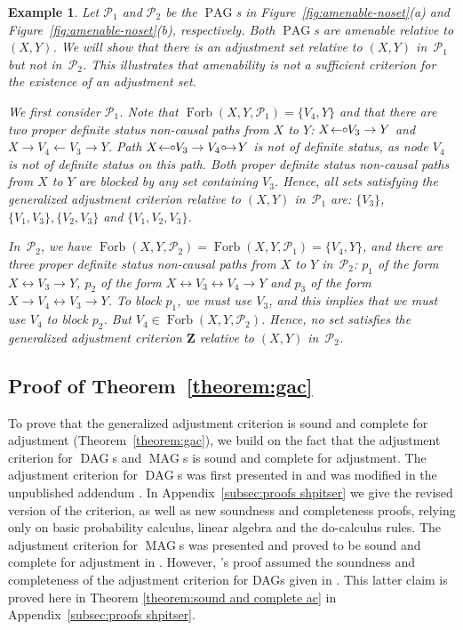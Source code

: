 \documentclass[11pt,a4paper]{article}
\newtheorem{example}{Example}
\DeclareMathOperator{\DAG}{DAG}
\DeclareMathOperator{\MAG}{MAG}
\DeclareMathOperator{\PAG}{PAG}
\DeclareMathOperator{\Forbi}{Forb}
\newcommand{\g}[1][G]{\mathcal{#1}}
\newcommand{\f}[2][X,Y]{\Forbi(#1,#2)}
\newcommand{\circarrow}{
  \setlength{\unitlength}{1mm}
  \begin{picture}(5,1)(0,0)
    \put(1,1){\circle{1}}
    \put(1.2,0){$\rightarrow$}
  \end{picture}
}
\newcommand{\arrowcirc}{
  \setlength{\unitlength}{1mm}
  \begin{picture}(5,1)(0,0)
    \put(0.2,0){$\leftarrow$}
    \put(4.3,1){\circle{1}}
  \end{picture}
}
\begin{document}
\begin{example}
  Let $\g[P]_1$ and $\g[P]_{2}$ be the $\PAG$s in Figure~\ref{fig:amenable-noset}(a) and Figure~\ref{fig:amenable-noset}(b), respectively.
  Both $\PAG$s are amenable relative to $(X,Y)$. We will show that there is an adjustment set relative to $(X,Y)$ in~$\g[P]_1$ but not in~$\g[P]_{2}$. This illustrates that amenability is not a sufficient
  criterion for the existence of an adjustment set.

  We first consider $\g[P]_1$. Note that $\f{\g[P]_1} = \{ V_4, Y \}$ and that there are two proper definite status non-causal paths from $X$ to $Y$: $X \arrowcirc V_3 \rightarrow Y$ and $X \rightarrow V_4 \leftarrow V_3 \rightarrow Y$. Path $X \arrowcirc V_3 \rightarrow V_4 \circarrow Y$ is not of definite status, as node $V_4$ is not of definite status on this path. Both proper definite status non-causal paths from $X$ to $Y$ are blocked by any set containing $V_3$. Hence, all sets satisfying the generalized adjustment criterion relative to $(X,Y)$ in~$\g[P]_1$ are: $\{ V_3 \}$, $\{V_1, V_3 \}, \{V_2, V_3 \}$ and $\{ V_1, V_2, V_3 \}$.

  In~$\g[P]_{2}$, we have $\f{\g[P]_{2}} = \f{\g[P]_1} = \{ V_4, Y \}$, and there are three proper definite status non-causal paths from $X$ to $Y$ in~$\g[P]_{2}$:  $p_1$ of the form $X \leftrightarrow V_3 \rightarrow Y$, $p_2$ of the form $ X \leftrightarrow V_3 \leftrightarrow V_4 \to Y$ and  $p_3$ of the form $X \rightarrow V_4 \leftrightarrow V_3 \rightarrow Y$. To block $p_1$, we must use $V_3$, and this implies that we must use $V_4$ to block $p_2$. But $V_4 \in \f{\g[P]_{2}}$. Hence, no set satisfies the generalized adjustment criterion $\mathbf{Z}$ relative to $(X,Y)$ in~$\g[P]_{2}$.
  \label{ex:amenable-noset}
\end{example}

\subsection{Proof of Theorem~\ref{theorem:gac}} \label{subsec:proof-theorem-gac}

To prove that the generalized adjustment criterion is sound and complete for adjustment (Theorem~\ref{theorem:gac}), we build on the fact that the adjustment criterion for $\DAG$s and $\MAG$s is sound and complete for adjustment. The adjustment criterion for $\DAG$s was first presented in \cite{shpitser2012validity} and was modified in the unpublished addendum \citep{shpitser2012avalidity}. In Appendix~\ref{subsec:proofs shpitser} we give the revised version of the criterion, as well as new soundness and completeness proofs, relying only on basic probability calculus, linear algebra and the do-calculus rules. 
The adjustment criterion for $\MAG$s was presented and proved to be sound and
complete for adjustment in \citet[][see Theorem~5.8]{vanconstructing}. However, \cite{vanconstructing}'s proof assumed the soundness and completeness of the adjustment criterion for DAGs given in \cite{shpitser2012avalidity}. This latter claim is
proved here in Theorem \ref{theorem:sound and complete ac} in Appendix~\ref{subsec:proofs shpitser}.
\end{document}
